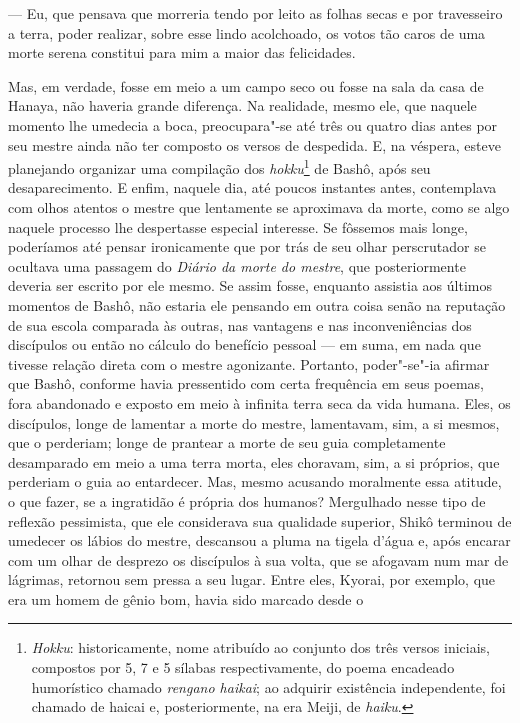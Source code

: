 --- Eu, que pensava que morreria tendo por leito as folhas secas e por
travesseiro a terra, poder realizar, sobre esse lindo acolchoado, os
votos tão caros de uma morte serena constitui para mim a maior das
felicidades.

Mas, em verdade, fosse em meio a um campo seco ou fosse na sala da casa
de Hanaya, não haveria grande diferença. Na realidade, mesmo ele, que
naquele momento lhe umedecia a boca, preocupara"-se até três ou quatro
dias antes por seu mestre ainda não ter composto os versos de
despedida. E, na véspera, esteve planejando organizar uma compilação
dos \textit{hokku}\footnote{ \textit{Hokku}: historicamente, nome
atribuído ao conjunto dos três versos iniciais, compostos por 5, 7 e 5
sílabas respectivamente, do poema encadeado humorístico chamado
\textit{rengano haikai}; ao adquirir existência independente, foi
chamado de haicai e, posteriormente, na era Meiji, de \textit{haiku}.}
de Bashô, após seu desaparecimento. E enfim, naquele dia, até poucos
instantes antes, contemplava com olhos atentos o mestre que lentamente
se aproximava da morte, como se algo naquele processo lhe despertasse
especial interesse. Se fôssemos mais longe, poderíamos até pensar
ironicamente que por trás de seu olhar perscrutador se ocultava uma
passagem do \textit{Diário da morte do mestre}, que posteriormente
deveria ser escrito por ele mesmo. Se assim fosse, enquanto assistia
aos últimos momentos de Bashô, não estaria ele pensando em outra coisa
senão na reputação de sua escola comparada às outras, nas vantagens e
nas inconveniências dos discípulos ou então no cálculo do benefício
pessoal --- em suma, em nada que tivesse relação direta com o mestre
agonizante. Portanto, poder"-se"-ia afirmar que Bashô, conforme havia
pressentido com certa frequência em seus poemas, fora abandonado e
exposto em meio à infinita terra seca da vida humana. Eles, os
discípulos, longe de lamentar a morte do mestre, lamentavam, sim, a si
mesmos, que o perderiam; longe de prantear a morte de seu guia
completamente desamparado em meio a uma terra morta, eles choravam,
sim, a si próprios, que perderiam o guia ao entardecer. Mas, mesmo
acusando moralmente essa atitude, o que fazer, se a ingratidão é
própria dos humanos? Mergulhado nesse tipo de reflexão pessimista, que
ele considerava sua qualidade superior, Shikô terminou de umedecer
os lábios do mestre, descansou a pluma na tigela d'água e, após encarar
com um olhar de desprezo os discípulos à sua volta, que se afogavam num
mar de lágrimas, retornou sem pressa a seu lugar. Entre eles, Kyorai,
por exemplo, que era um homem de gênio bom, havia sido marcado desde o
